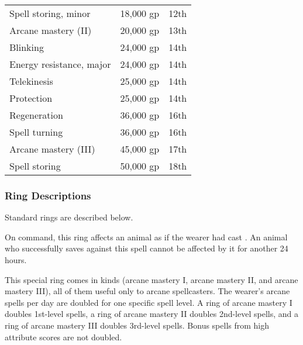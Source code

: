\begin{dtable}
\begin{tabularx}{\columnwidth}{>{\lcol}X l l}
Spell storing, minor & 18,000 gp & 12th \\
Arcane mastery (II) & 20,000 gp & 13th \\
Blinking & 24,000 gp & 14th \\
Energy resistance, major & 24,000 gp & 14th \\
Telekinesis & 25,000 gp & 14th \\
Protection \plus5 & 25,000 gp & 14th \\
Regeneration & 36,000 gp & 16th \\
Spell turning & 36,000 gp & 16th \\
Arcane mastery (III) & 45,000 gp & 17th \\
Spell storing & 50,000 gp & 18th \\
\end{tabularx}
\end{dtable}

\subsubsection{Ring Descriptions}

Standard rings are described below.

 On command, this ring affects an animal as if the wearer had cast . An animal who successfully saves against this spell cannot be affected by it for another 24 hours.


 This special ring comes in  kinds (arcane mastery I, arcane mastery II, and arcane mastery III), all of them useful only to arcane spellcasters. The wearer's arcane spells per day are doubled for one specific spell level. A ring of arcane mastery I doubles 1st-level spells, a ring of arcane mastery II doubles 2nd-level spells, and a ring of arcane mastery III doubles 3rd-level spells. Bonus spells from high attribute scores are not doubled.


